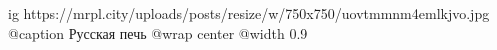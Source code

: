  
 
 
 
 

\ifcmt
  ig https://mrpl.city/uploads/posts/resize/w/750x750/uovtmmnm4emlkjvo.jpg
	@caption Русская печь
  @wrap center
  @width 0.9
\fi
